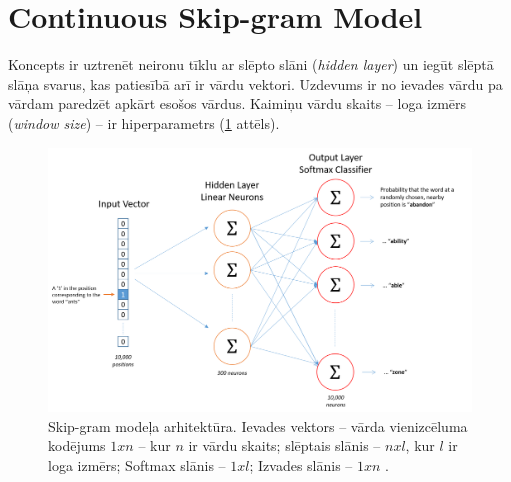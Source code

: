 \section{Continuous Skip-gram Model}


Koncepts ir uztrenēt neironu tīklu ar slēpto slāni (\textit{hidden layer}) un iegūt slēptā slāņa svarus, kas patiesībā arī ir vārdu vektori. Uzdevums ir no ievades vārdu pa vārdam paredzēt apkārt esošos vārdus. Kaimiņu vārdu skaits -- loga izmērs (\textit{window size}) -- ir hiperparametrs (\ref{fig:skipgram} attēls).


\begin{figure}[h]
	\centering
	\includegraphics[width=\textwidth]{figures/skip_gram_net_arch.png}
	\caption{Skip-gram modeļa arhitektūra.
	Ievades vektors -- vārda vienizcēluma kodējums $1xn$ -- kur $n$ ir vārdu skaits; 
	slēptais slānis --  $nxl$, kur $l$ ir loga izmērs;
	Softmax slānis -- $1xl$;
	Izvades slānis -- $1xn$ \cite{mccormick2016}.}
	\label{fig:skipgram}
\end{figure}




